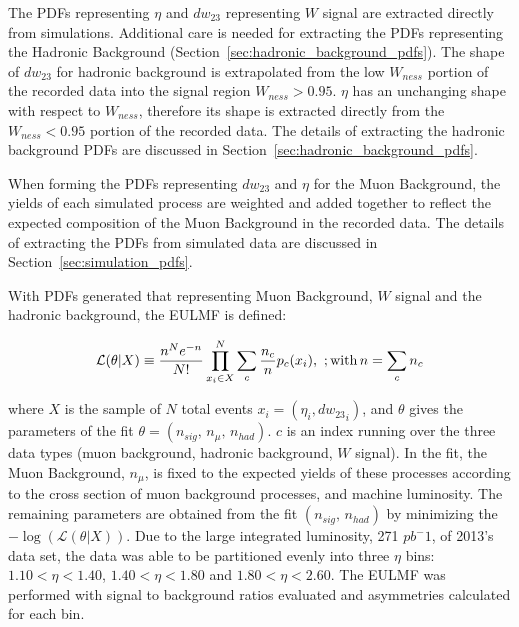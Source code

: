 The PDFs representing $\eta$ and $dw_{23}$ representing  $W$ signal are
extracted directly from simulations. Additional care is needed for extracting
the PDFs representing the Hadronic Background
(Section~\ref{sec:hadronic_background_pdfs}). The shape of $dw_{23}$ for
hadronic background is extrapolated from the low $W_{ness}$ portion of the
recorded data into the signal region $W_{ness} > 0.95$. $\eta$ has an unchanging
shape with respect to $W_{ness}$, therefore its shape is extracted directly from
the $W_{ness} < 0.95$ portion of the recorded data. The details of extracting
the hadronic background PDFs are discussed in
Section~\ref{sec:hadronic_background_pdfs}.

When forming the PDFs representing $dw_{23}$ and $\eta$ for the Muon Background,
the yields of each simulated process are weighted and added together to reflect
the expected composition of the Muon Background in the recorded data. The
details of extracting the PDFs from simulated data are discussed in
Section~\ref{sec:simulation_pdfs}. 

{\noindent}With PDFs generated that representing Muon Background, $W$ signal and
the hadronic background, the EULMF is defined:

\begin{equation} 
  \mathcal{L}(\theta|X) 
  \equiv
  \frac{n^N e^{-n}}{N!} \prod_{x_i \in X}^N
  \sum_c \frac{n_c}{n} p_c (x_i), \
  ;{\rm with}\, 
  n=\sum_c n_c 
  \label{eq:likelihood_function}
\end{equation} 

{\noindent}where $X$ is the sample of $N$ total events $x_i =
(\eta_i,{dw_{23}}_i)$, and $\theta$ gives the parameters of the fit $\theta =
(n_{sig},\,n_\mu,\, n_{had})$. $c$ is an index running over the three data types
(muon background, hadronic background, $W$ signal). In the fit, the Muon
Background, $n_\mu$, is fixed to the expected yields of these processes
according to the cross section of muon background processes, and machine
luminosity. The remaining parameters are obtained from the fit $(n_{sig},\,
n_{had})$ by minimizing the $-\log(\mathcal{L}(\theta|X))$. Due to the large
integrated luminosity, 271 $pb^-1$, of 2013's data set, the data was able to be
partitioned evenly into three $\eta$ bins: $1.10 < \eta < 1.40$, $1.40 < \eta <
1.80$ and $1.80 < \eta < 2.60$. The EULMF was performed with signal to
background ratios evaluated and asymmetries calculated for each bin.

